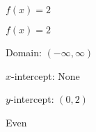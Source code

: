 {$f(x) = 2$}
{$f(x) = 2$

Domain: $(-\infty, \infty)$ 

$x$-intercept: None

$y$-intercept: $\left(0, 2 \right)$ 

Even

\begin{center}
\end{center}
}